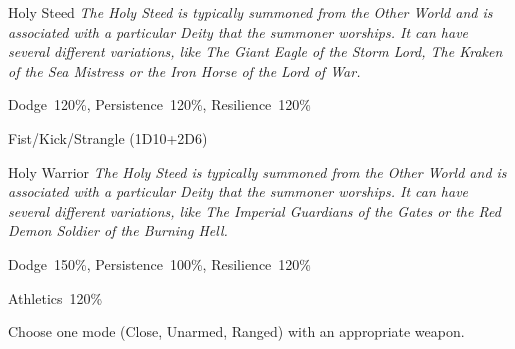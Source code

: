 \newpage



\begin{monsterbox}{Holy Steed}
	\label{monster:holy-steed}
	\textit{The Holy Steed is typically summoned from the Other World and is associated with a particular Deity that the summoner worships. It can have several different variations, like The Giant Eagle of the Storm Lord, The Kraken of the Sea Mistress or the Iron Horse of the Lord of War.}\\
	\rpghline
	\basics[%
        hitpoints  = 25,
	majorwound = 13,
	damagemodifier = +2D6,
	powerpoints = 18,
	movementrate = 20m,
	armor = Special (6AP),
	plunderrating = 0
	]
	\rpghline%
	\stats[ %
		STR = 30,
		CON = 20,
		DEX = 18,
		SIZ = 30,
		INT = 18,
		POW = 18,
		CHA = 18
	]
	\rpghline%
	\begin{rpg-monsteraction}[Resistances]
		Dodge~120\%, Persistence~120\%, Resilience~120\%
	\end{rpg-monsteraction}
	\begin{rpg-monsteraction}
		Fist/Kick/Strangle (1D10+2D6)
	\end{rpg-monsteraction}
\end{monsterbox}

\newpage

\begin{monsterbox}{Holy Warrior}
	\label{monster:holy-warrior}
	\textit{The Holy Steed is typically summoned from the Other World and is associated with a particular Deity that the summoner worships. It can have several different variations, like The Imperial Guardians of the Gates or the Red Demon Soldier of the Burning Hell.}\\
	\rpghline
	\basics[%
        hitpoints  = 18,
	majorwound = 9,
	damagemodifier = +1D6,
	powerpoints = 18,
	movementrate = 12m,
	armor = Special (6AP),
	plunderrating = 0
	]
	\rpghline%
	\stats[ %
		STR = 20,
		CON = 18,
		DEX = 15,
		SIZ = 18,
		INT = 15,
		POW = 18,
		CHA = 18
	]
	\rpghline%
	\begin{rpg-monsteraction}[Resistances]
		Dodge~150\%, Persistence~100\%, Resilience~120\%
	\end{rpg-monsteraction}
	\begin{rpg-monsteraction}[Practical]
		Athletics~120\%
	\end{rpg-monsteraction}
	\begin{rpg-monsteraction}[Combat 150\%]
		Choose one mode (Close, Unarmed, Ranged) with an appropriate weapon.
	\end{rpg-monsteraction}
\end{monsterbox}

